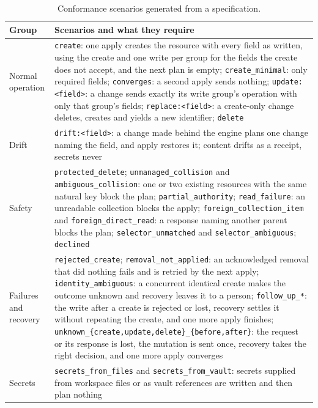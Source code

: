 \begin{table}[tbp]
\centering
\small
\caption{Conformance scenarios generated from a specification.}
\label{tab:11}
\begin{tabularx}{\linewidth}{lL}
\toprule
Group & Scenarios and what they require \\
\midrule
Normal operation & \texttt{create}: one apply creates the resource with every field as written, using the create and one write per group for the fields the create does not accept, and the next plan is empty; \texttt{create\_minimal}: only required fields; \texttt{converges}: a second apply sends nothing; \texttt{update:\textless{}field\textgreater{}}: a change sends exactly its write group's operation with only that group's fields; \texttt{replace:\textless{}field\textgreater{}}: a create-only change deletes, creates and yields a new identifier; \texttt{delete} \\
Drift & \texttt{drift:\textless{}field\textgreater{}}: a change made behind the engine plans one change naming the field, and apply restores it; content drifts as a receipt, secrets never \\
Safety & \texttt{protected\_delete}; \texttt{unmanaged\_collision} and \texttt{ambiguous\_collision}: one or two existing resources with the same natural key block the plan; \texttt{partial\_authority}; \texttt{read\_failure}: an unreadable collection blocks the apply; \texttt{foreign\_collection\_item} and \texttt{foreign\_direct\_read}: a response naming another parent blocks the plan; \texttt{selector\_unmatched} and \texttt{selector\_ambiguous}; \texttt{declined} \\
Failures and recovery & \texttt{rejected\_create}; \texttt{removal\_not\_applied}: an acknowledged removal that did nothing fails and is retried by the next apply; \texttt{identity\_ambiguous}: a concurrent identical create makes the outcome unknown and recovery leaves it to a person; \texttt{follow\_up\_*}: the write after a create is rejected or lost, recovery settles it without repeating the create, and one more apply finishes; \texttt{unknown\_\{create,update,delete\}\_\{before,after\}}: the request or its response is lost, the mutation is sent once, recovery takes the right decision, and one more apply converges \\
Secrets & \texttt{secrets\_from\_files} and \texttt{secrets\_from\_vault}: secrets supplied from workspace files or as vault references are written and then plan nothing \\
\bottomrule
\end{tabularx}
\end{table}

